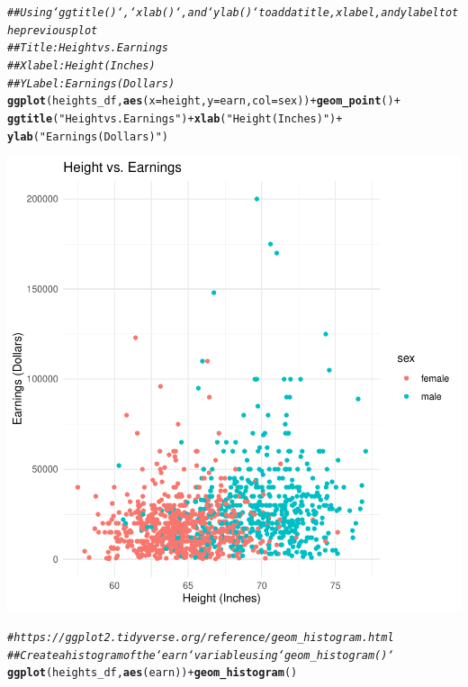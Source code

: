 \documentclass{article}\usepackage[]{graphicx}\usepackage[]{xcolor}
\makeatletter
\newcommand{\hlstr}[1]{\textcolor[rgb]{0.192,0.494,0.8}{#1}}%
\newcommand{\hlcom}[1]{\textcolor[rgb]{0.678,0.584,0.686}{\textit{#1}}}%
\newcommand{\hlopt}[1]{\textcolor[rgb]{0,0,0}{#1}}%
\newcommand{\hlstd}[1]{\textcolor[rgb]{0.345,0.345,0.345}{#1}}%
\newcommand{\hlkwc}[1]{\textcolor[rgb]{0.333,0.667,0.333}{#1}}%
\newcommand{\hlkwd}[1]{\textcolor[rgb]{0.737,0.353,0.396}{\textbf{#1}}}%
\newenvironment{kframe}{%
 \def\at@end@of@kframe{}%
 \ifinner\ifhmode%
  \def\at@end@of@kframe{\end{minipage}}%
  \begin{minipage}{\columnwidth}%
 \fi\fi%
 \def\FrameCommand##1{\hskip\@totalleftmargin \hskip-\fboxsep
 \colorbox{shadecolor}{##1}\hskip-\fboxsep
     \hskip-\linewidth \hskip-\@totalleftmargin \hskip\columnwidth}%
 \MakeFramed {\advance\hsize-\width
   \@totalleftmargin\z@ \linewidth\hsize
   \@setminipage}}%
 {\par\unskip\endMakeFramed%
 \at@end@of@kframe}
\newenvironment{knitrout}{}{} %
\makeatother
\begin{document}
\begin{knitrout}
{}


\begin{kframe}\begin{alltt}
\hlcom{## Using `ggtitle()`, `xlab()`, and `ylab()` to add a title, x label, and y label to the previous plot}
\hlcom{## Title: Height vs. Earnings}
\hlcom{## X label: Height (Inches)}
\hlcom{## Y Label: Earnings (Dollars)}
\hlkwd{ggplot}\hlstd{(heights_df,} \hlkwd{aes}\hlstd{(}\hlkwc{x}\hlstd{=height,} \hlkwc{y}\hlstd{=earn,} \hlkwc{col}\hlstd{=sex))} \hlopt{+} \hlkwd{geom_point}\hlstd{()} \hlopt{+}
        \hlkwd{ggtitle}\hlstd{(}\hlstr{"Height vs. Earnings"}\hlstd{)} \hlopt{+} \hlkwd{xlab}\hlstd{(}\hlstr{"Height (Inches)"}\hlstd{)}  \hlopt{+}
        \hlkwd{ylab}\hlstd{(}\hlstr{"Earnings (Dollars)"}\hlstd{)}
\end{alltt}
\end{kframe}

{\centering \includegraphics[width=.6\linewidth]{figure/assignment-03-ChattapadhyayKausik-Rnwauto-report-8} 

}


\begin{kframe}\begin{alltt}
\hlcom{# https://ggplot2.tidyverse.org/reference/geom_histogram.html}
\hlcom{## Create a histogram of the `earn` variable using `geom_histogram()`}
\hlkwd{ggplot}\hlstd{(heights_df,} \hlkwd{aes}\hlstd{(earn))} \hlopt{+} \hlkwd{geom_histogram}\hlstd{()}
\end{alltt}


{\ttfamily\noindent\itshape\color{messagecolor}{\#\# `stat\_bin()` using `bins = 30`. Pick better value with `binwidth`.}}\end{kframe}


\end{knitrout}
\end{document}

